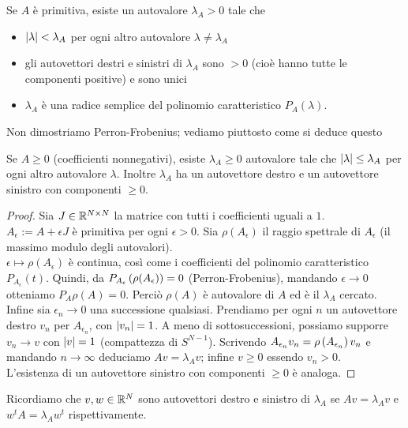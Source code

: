 \begin{teo}Se $A$ è primitiva, esiste un autovalore $\lambda_A>0$ tale che
\begin{itemize}
	\item $\left|\lambda\right|<\lambda_A$ per ogni altro autovalore $\lambda\neq\lambda_A$
	\item gli autovettori destri e sinistri di $\lambda_A$ sono $>0$ (cioè hanno tutte le componenti positive) e sono unici
	\item $\lambda_A$ è una radice semplice del polinomio caratteristico $P_A(\lambda)$.
\end{itemize}
\end{teo}

Non dimostriamo Perron-Frobenius; vediamo piuttosto come si deduce questo

\begin{cor}Se $A\ge 0$ (coefficienti nonnegativi), esiste $\lambda_A\ge 0$ autovalore tale che
$\left|\lambda\right|\le \lambda_A$ per ogni altro autovalore $\lambda$. Inoltre $\lambda_A$ ha un autovettore destro e un autovettore sinistro
con componenti $\ge 0$.
\end{cor}

\begin{proof}Sia $J\in\mathbb{R}^{N\times N}$ la matrice con tutti i coefficienti uguali a $1$. \\
$A_\epsilon:=A+\epsilon J$ è primitiva per ogni $\epsilon>0$. Sia $\rho(A_\epsilon)$ il raggio spettrale di $A_\epsilon$
(il massimo modulo degli autovalori). \\
$\epsilon\mapsto\rho(A_\epsilon)$ è continua, così come i coefficienti del polinomio caratteristico $P_{A_\epsilon}(t)$.
Quindi, da $P_{A_\epsilon}\left(\rho(A_\epsilon)\right)=0$ (Perron-Frobenius), mandando $\epsilon\to 0$ otteniamo $P_A{\rho(A)}=0$.
Perciò $\rho(A)$ è autovalore di $A$ ed è il $\lambda_A$ cercato. \\
Infine sia $\epsilon_n\to 0$ una successione qualsiasi. Prendiamo per ogni $n$ un autovettore destro $v_n$
per $A_{\epsilon_n}$, con $\left|v_n\right|=1$. A meno di sottosuccessioni, possiamo supporre $v_n\to v$ con $\left|v\right|=1$
(compattezza di $S^{N-1}$). Scrivendo $A_{\epsilon_n}v_n=\rho\left(A_{\epsilon_n}\right)v_n$ e mandando $n\to\infty$ deduciamo
$Av=\lambda_A v$; infine $v\ge 0$ essendo $v_n>0$. \\
L'esistenza di un autovettore sinistro con componenti $\ge 0$ è analoga.
\end{proof}

Ricordiamo che $v,w\in\mathbb{R}^N$ sono autovettori destro e sinistro di $\lambda_A$ se $Av=\lambda_A v$ e $w^t A=\lambda_A w^t$ rispettivamente.

